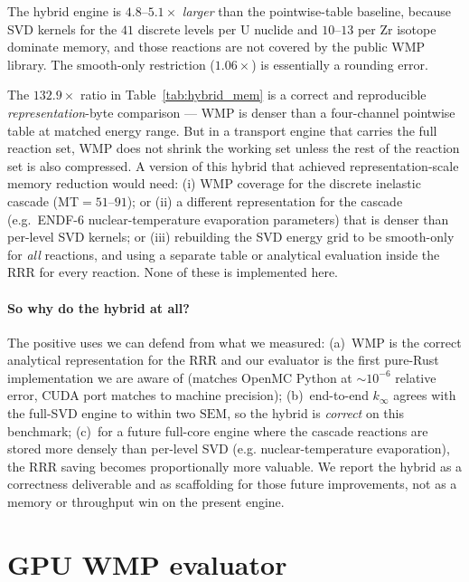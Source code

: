 \documentclass[11pt,a4paper]{article}
\begin{document}
The hybrid engine is $4.8$--$5.1\times$ \emph{larger} than
the pointwise-table baseline, because SVD kernels for the
$41$ discrete levels per U nuclide and $10$--$13$ per Zr
isotope dominate memory, and those reactions are not covered
by the public WMP library. The smooth-only restriction
($1.06\times$) is essentially a rounding error.

The $132.9\times$ ratio in Table~\ref{tab:hybrid_mem} is a
correct and reproducible \emph{representation}-byte
comparison --- WMP is denser than a four-channel pointwise
table at matched energy range. But in a transport engine that
carries the full reaction set, WMP does not shrink the
working set unless the rest of the reaction set is also
compressed. A version of this hybrid that achieved
representation-scale memory reduction would need: (i) WMP
coverage for the discrete inelastic cascade
(MT$=51$--$91$); or (ii) a different representation for the
cascade (e.g.\ ENDF-6 nuclear-temperature evaporation
parameters) that is denser than per-level SVD kernels; or
(iii) rebuilding the SVD energy grid to be smooth-only for
\emph{all} reactions, and using a separate table or
analytical evaluation inside the RRR for every reaction. None
of these is implemented here.

\paragraph{So why do the hybrid at all?}
The positive uses we can defend from what we measured:
(a)~WMP is the correct analytical representation for the RRR
and our evaluator is the first pure-Rust implementation we
are aware of (matches OpenMC Python at $\sim\!10^{-6}$
relative error, CUDA port matches to machine precision);
(b)~end-to-end $k_\infty$ agrees with the full-SVD engine to
within two $\mathrm{SEM}$, so the hybrid is \emph{correct}
on this benchmark; (c)~for a future full-core engine where
the cascade reactions are stored more densely than per-level
SVD (e.g. nuclear-temperature evaporation), the RRR saving
becomes proportionally more valuable. We report the hybrid
as a correctness deliverable and as scaffolding for those
future improvements, not as a memory or throughput win on
the present engine.

\section{GPU WMP evaluator}
\label{sec:gpu_wmp}
\end{document}
